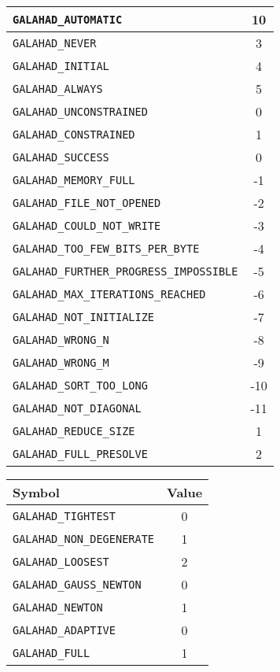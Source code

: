 \documentclass{galahad}
\begin{document}
\begin{figure}[htbp]
\begin{center}
\begin{tabular}{|l|c|}
{\tt GALAHAD\_AUTOMATIC}            & 10 \\
\hline
{\tt GALAHAD\_NEVER}                &  3 \\
{\tt GALAHAD\_INITIAL}              &  4 \\
{\tt GALAHAD\_ALWAYS}               &  5 \\
\hline
{\tt GALAHAD\_UNCONSTRAINED}        &  0 \\
{\tt GALAHAD\_CONSTRAINED}          &  1 \\
\hline
{\tt GALAHAD\_SUCCESS}              &  0 \\
{\tt GALAHAD\_MEMORY\_FULL}         & -1 \\
{\tt GALAHAD\_FILE\_NOT\_OPENED}    & -2 \\
{\tt GALAHAD\_COULD\_NOT\_WRITE}    & -3 \\
{\tt GALAHAD\_TOO\_FEW\_BITS\_PER\_BYTE} &  -4 \\
{\tt GALAHAD\_FURTHER\_PROGRESS\_IMPOSSIBLE} & -5 \\
{\tt GALAHAD\_MAX\_ITERATIONS\_REACHED} & -6 \\
{\tt GALAHAD\_NOT\_INITIALIZE}      & -7 \\
{\tt GALAHAD\_WRONG\_N}             & -8 \\
{\tt GALAHAD\_WRONG\_M}             & -9 \\
{\tt GALAHAD\_SORT\_TOO\_LONG}      & -10 \\
{\tt GALAHAD\_NOT\_DIAGONAL}        & -11 \\
\hline
{\tt GALAHAD\_REDUCE\_SIZE}         &  1 \\
{\tt GALAHAD\_FULL\_PRESOLVE}       &  2 \\
\hline
\end{tabular}
\hspace*{1cm}
\begin{tabular}{|l|c|}
\hline
Symbol                              & Value \\
\hline
{\tt GALAHAD\_TIGHTEST}             &  0 \\
{\tt GALAHAD\_NON\_DEGENERATE}      &  1 \\
{\tt GALAHAD\_LOOSEST}              &  2 \\
\hline
{\tt GALAHAD\_GAUSS\_NEWTON}        &  0 \\
{\tt GALAHAD\_NEWTON}               &  1 \\
\hline
{\tt GALAHAD\_ADAPTIVE}             &  0 \\
{\tt GALAHAD\_FULL}                 &  1 \\

\end{tabular}
\end{center}
\end{figure}
\end{document}
